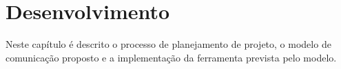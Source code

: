 \chapter{Desenvolvimento}

Neste capítulo é descrito o processo de planejamento de projeto, o modelo de comunicação proposto e a implementação da ferramenta prevista pelo modelo.





